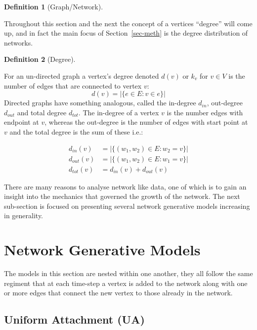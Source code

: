 \documentclass[
  10pt,
  a4paper,
]{scrreprt}
\theoremstyle{plain}
\theoremstyle{definition}
\newtheorem{definition}{Definition}[section]
\theoremstyle{remark}
\begin{document}
{\begin{definition}[Graph/Network]
\end{definition}

Throughout this section and the next the concept of a vertices
``degree'' will come up, and in fact the main focus of
Section~\ref{sec-meth} is the degree distribution of networks.

\begin{definition}[Degree]\protect\hypertarget{def-deg}{}\label{def-deg}

For an un-directed graph a vertex's degree denoted \(d(v)\) or \(k_v\)
for \(v\in V\) is the number of edges that are connected to vertex
\(v\): \[
d(v) = |\{e\in E : v \in e\}|
\] Directed graphs have something analogous, called the in-degree
\(d_{in}\), out-degree \(d_{out}\) and total degree \(d_{tot}\). The
in-degree of a vertex \(v\) is the number edges with endpoint at \(v\),
whereas the out-degree is the number of edges with start point at \(v\)
and the total degree is the sum of these i.e.:

\begin{align*}
d_{in}(v)&= |\{(w_1,w_2)\in E: w_2=v \}|\\
d_{out}(v) &= |\{(w_1,w_2)\in E: w_1=v \}|\\
d_{tot}(v) &= d_{in}(v) + d_{out}(v)
\end{align*}

\end{definition}

There are many reasons to analyse network like data, one of which is to
gain an insight into the mechanics that governed the growth of the
network. The next sub-section is focused on presenting several network
generative models increasing in generality.

\hypertarget{network-generative-models}{%
\section{Network Generative Models}\label{network-generative-models}}

The models in this section are nested within one another, they all
follow the same regiment that at each time-step a vertex is added to the
network along with one or more edges that connect the new vertex to
those already in the network.

\hypertarget{uniform-attachment-ua}{%
\subsection{Uniform Attachment (UA)}\label{uniform-attachment-ua}}

}
\end{document}

